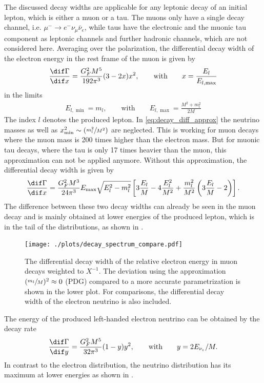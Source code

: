 The discussed decay widths are applicable for any leptonic decay of an initial lepton, which is either a muon or a tau.
The muons only have a single decay channel, i.e. $\mu^- \to e^- \nu_{\mu} \bar{\nu}_e$, while taus have the electronic and the muonic tau component as leptonic channels and further hadronic channels, which are not considered here.
Averaging over the polarization, the differential decay width of the electron energy in the rest frame of the muon is given by \cite{PDG20}
\begin{align} \label{eq:decay_diff_approx}
    \frac{\dif \Gamma}{\dif x} = \frac{G_F^2 M^5}{192 \pi^3} (3 - 2x)x^2 ,
    \qquad \text{with} \qquad
    x = \frac{E_l}{E_{l, \max}}
\end{align}
in the limits
\begin{align}
    E_{l, \min} = m_l ,
    \qquad \text{with} \qquad
    E_{l, \max} = \frac{M^2 + m_l^2}{2 M}
\end{align}
The index $l$ denotes the produced lepton.
In \eqref{eq:decay_diff_approx} the neutrino masses as well as $x_{\min}^2 \sim (\sfrac{m_l^2}{M^2})$ are neglected.
This is working for muon decays where the muon mass is 200 times higher than the electron mass.
But for muonic tau decays, where the tau is only 17 times heavier than the muon, this approximation can not be applied anymore.
Without this approximation, the differential decay width is given by \cite{Lahiri04}
\begin{align}
    \frac{\dif \Gamma}{\dif x} = \frac{G_F^2 M^3}{24 \pi^3}
        E_{\text{max}} \sqrt{E_l^2 - m_l^2}
        \left[ 3 \frac{E_l}{M} - 4 \frac{E_l^2}{M^2} + \frac{m_l^2}{M^2} \left(3 \frac{E_l}{M} - 2\right) \right] .
\end{align}
The difference between these two decay widths can already be seen in the muon decay and is mainly obtained at lower energies of the produced lepton, which is in the tail of the distributions, as shown in .
\begin{figure}
    \centering
    \texttt{[image: ./plots/decay\_spectrum\_compare.pdf]}
    \caption{The differential decay width of the relative electron energy in muon decays weighted to $X^{-1}$.
    The deviation using the approximation $(\sfrac{m_l}{M})^2\approx0$ (PDG) compared to a more accurate parametrization is shown in the lower plot.
    For comparisons, the differential decay width of the electron neutrino is also included.}
    \label{fig:decay_spectrum_compare}
\end{figure}

The energy of the produced left-handed electron neutrino can be obtained by the decay rate \cite{PDG20}
\begin{align}
    \frac{\dif \Gamma}{\dif y} = \frac{G_F^2 M^5}{32 \pi^3} (1 - y)y^2 ,
    \qquad \text{with} \qquad
    y = 2 E_{\nu_e} / M .
\end{align}
In contrast to the electron distribution, the neutrino distribution has its maximum at lower energies as shown in .
